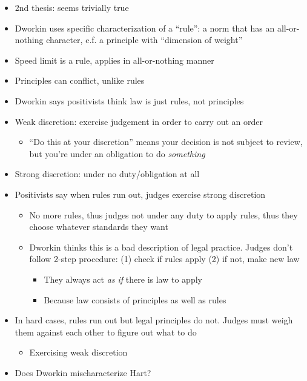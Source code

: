 \begin{itemize}
\tightlist
\item
  2nd thesis: seems trivially true
\item
  Dworkin uses specific characterization of a ``rule'': a norm that has
  an all-or-nothing character, c.f. a principle with ``dimension of
  weight''
\item
  Speed limit is a rule, applies in all-or-nothing manner
\item
  Principles can conflict, unlike rules
\item
  Dworkin says positivists think law is just rules, not principles
\item
  Weak discretion: exercise judgement in order to carry out an order

  \begin{itemize}
  \tightlist
  \item
    ``Do this at your discretion'' means your decision is not subject to
    review, but you're under an obligation to do \emph{something}
  \end{itemize}
\item
  Strong discretion: under no duty/obligation at all
\item
  Positivists say when rules run out, judges exercise strong discretion

  \begin{itemize}
  \tightlist
  \item
    No more rules, thus judges not under any duty to apply rules, thus
    they choose whatever standards they want
  \item
    Dworkin thinks this is a bad description of legal practice. Judges
    don't follow 2-step procedure: (1) check if rules apply (2) if not,
    make new law

    \begin{itemize}
    \tightlist
    \item
      They always act \emph{as if} there is law to apply
    \item
      Because law consists of principles as well as rules
    \end{itemize}
  \end{itemize}
\item
  In hard cases, rules run out but legal principles do not. Judges must
  weigh them against each other to figure out what to do

  \begin{itemize}
  \tightlist
  \item
    Exercising weak discretion
  \end{itemize}
\item
  Does Dworkin mischaracterize Hart?


\end{itemize}

